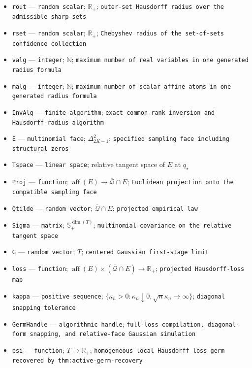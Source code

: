 \documentclass{article}
\begin{document}
\begin{itemize}
  \item \texttt{rout} --- \texttt{random scalar}; \(\mathbb R_+\); \texttt{outer-\allowbreak{}set Hausdorff radius over the admissible sharp sets}
  \item \texttt{rset} --- \texttt{random scalar}; \(\mathbb R_+\); \texttt{Chebyshev radius of the set-\allowbreak{}of-\allowbreak{}sets confidence collection}
  \item \texttt{valg} --- \texttt{integer}; \(\mathbb N\); \texttt{maximum number of real variables in one generated radius formula}
  \item \texttt{malg} --- \texttt{integer}; \(\mathbb N\); \texttt{maximum number of scalar affine atoms in one generated radius formula}
  \item \texttt{InvAlg} --- \texttt{finite algorithm}; \texttt{exact common-\allowbreak{}rank inversion and Hausdorff-\allowbreak{}radius algorithm}
  \item \texttt{E} --- \texttt{multinomial face}; \(\Delta_{2K-1}^2\); \texttt{specified sampling face including structural zeros}
  \item \texttt{Tspace} --- \texttt{linear space}; relative tangent space of \(E\) at \(q_\star\)
  \item \texttt{Proj} --- \texttt{function}; \(\operatorname{aff}(E)\to\overline{\mathcal Q}\cap E\); \texttt{Euclidean projection onto the compatible sampling face}
  \item \texttt{Qtilde} --- \texttt{random vector}; \(\overline{\mathcal Q}\cap E\); \texttt{projected empirical law}
  \item \texttt{Sigma} --- \texttt{matrix}; \(\mathbb S_+^{\dim(T)}\); \texttt{multinomial covariance on the relative tangent space}
  \item \texttt{G} --- \texttt{random vector}; \(T\); \texttt{centered Gaussian first-\allowbreak{}stage limit}
  \item \texttt{loss} --- \texttt{function}; \(\operatorname{aff}(E)\times(\overline{\mathcal Q}\cap E)\to\mathbb R_+\); \texttt{projected Hausdorff-\allowbreak{}loss map}
  \item \texttt{kappa} --- \texttt{positive sequence}; \(\{\kappa_n>0:\kappa_n\downarrow0,\sqrt n\kappa_n\to\infty\}\); \texttt{diagonal snapping tolerance}
  \item \texttt{GermHandle} --- \texttt{algorithmic handle}; \texttt{full-\allowbreak{}loss compilation,\allowbreak{} diagonal-\allowbreak{}form snapping,\allowbreak{} and relative-\allowbreak{}face Gaussian simulation}
  \item \texttt{psi} --- \texttt{function}; \(T\to\mathbb R_+\); \texttt{homogeneous local Hausdorff-\allowbreak{}loss germ recovered by thm:\allowbreak{}active-\allowbreak{}germ-\allowbreak{}recovery}
\end{itemize}
\end{document}
